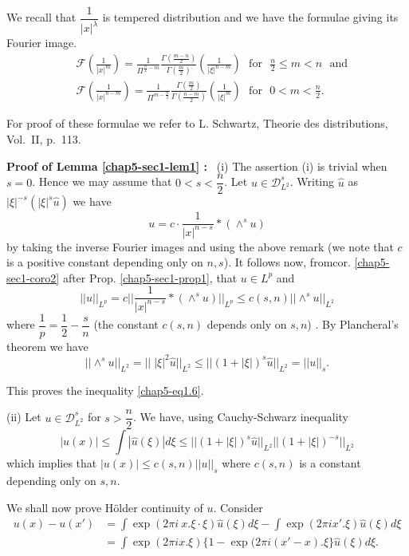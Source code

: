 \begin{remark*}
We recall that $\dfrac{1}{|x|^\lambda}$ is tempered
distribution and we have the formulae giving its Fourier image.   
\begin{equation*}
\begin{split}
& \mathscr{F} \left(\frac{1}{|x|^m}\right) = \frac{1}{\Pi^{\frac{n}{2}- m}}
\frac{\Gamma(\frac{m-n}{2})}{\Gamma(\frac{m}{2})}
\left(\frac{1}{|\xi|^{n-m}}\right) \text{~ for~ } \frac{n}{2}
 \leq m < n \text{~ and}\\  
& \mathscr{F}\left(\frac{1}{|x|^{n-m}}\right) = \frac{1}{\Pi^{m-\frac{n}{2}}}
 \frac{\Gamma(\frac{m}{2})}{\Gamma(\frac{n-m}{2})}\left(\frac{1}{|\xi|^m
 }\right)\text{~ for~ } 0 < m < \frac{n}{2}. 
\end{split}
\tag{1.9}\label{chap5-eq1.9}   
\end{equation*}

For proof of these formulae we refer to L. Schwartz, Theorie des
distributions, Vol.~II, p.~113. 
\end{remark*} 

\noindent
{\bf Proof of Lemma \ref{chap5-sec1-lem1} :}~ 
(i) The assertion (i) is trivial when $s=0$. Hence we may assume that
   $ 0 < s <\dfrac{n}{2}$. Let $u \in
   \mathscr{D}^s_{L^2}$. Writing $\hat{u}$ as $|\xi|^{-s} (|\xi|^s
   \hat{u})$ we have  
$$
u = c \cdot \frac{1}{|x|^{n-s}} * (\wedge^s u) 
$$
by taking the inverse Fourier images and using the above remark (we
note that $c$ is a positive constant depending only on $n, s$). It
follows now, from\pageoriginale cor. \ref{chap5-sec1-coro2} after
Prop. \ref{chap5-sec1-prop1}, that 
$u\in L^p$ and    
$$
|| u ||_{L^p} = c || \frac{1}{|x|^{n-s}} * (\wedge^{s} u) ||_{L^p}
\leq c (s, n ) || \wedge^s u ||_{L^2}  
$$
where $\dfrac{1}{p} = \dfrac{1}{2} - \dfrac{s}{n}$ (the constant $c(s,
n)$ depends only on $s,n$) . By Plancheral's theorem we have  
$$
|| \wedge^s u ||_{L^2} = || \; |\xi |^2 \hat{u} ||_{L^2} \leq || (1 +
|\xi |)^s \hat{u} ||_{L^2}= || u ||_s.  
$$

This proves the inequality \eqref{chap5-eq1.6}. 


(ii) Let $u \in \mathscr{D}^s_{ L^2}$ for $s >
\dfrac{n}{2}$. We have, using Cauchy-Schwarz inequality  
$$
|u (x) | \leq \int |\hat{u} (\xi)| d \xi \leq || ( 1 +|\xi |)^s
\hat{u}||_{L^2} || (1 + |\xi |)^{-s}||_{L^2} 
$$
which implies that $|u(x)| \leq c(s, n ) ||u||_s$ where $c(s, n)$ is a
constant depending only on $s, n$.  
 
 
We shall now prove H\"older continuity of $u$. Consider 
\begin{align*}
u(x) - u(x') & = \int \exp (2 \pi i\ x.\xi \cdot \xi ) \hat{u} (\xi) d \xi - \int
\exp (2 \pi i x'. \xi ) \hat{u} (\xi) d \xi \\ 
& = \int \exp (2 \pi i x . \xi ) \{1 - \exp (2 \pi i (x' - x). \xi  \}
\hat{u} (\xi) d \xi.  
\end{align*} 

